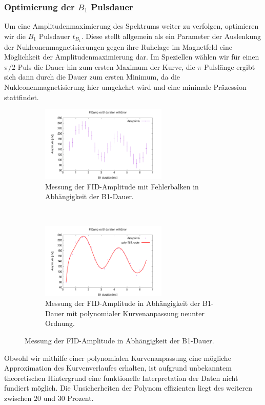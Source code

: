 \documentclass[../../main.tex]{subfiles}
\begin{document}
        \subsubsection*{Optimierung der $B_1$ Pulsdauer}\label{subsubsec:5:B1PulsdauerOptimierung}
            Um eine Amplitudenmaximierung des Spektrums weiter zu verfolgen, optimieren wir die $B_1$ Pulsdauer $t_{B_1}$. Diese stellt allgemein als ein Parameter der Auslenkung der Nukleonenmagnetisierungen gegen ihre Ruhelage im Magnetfeld eine Möglichkeit der Amplitudenmaximierung dar. Im Speziellen wählen wir für einen $\pi/2$ Puls die Dauer hin zum ersten Maximum der Kurve, die $\pi$ Pulslänge ergibt sich dann durch die Dauer zum ersten Minimum, da die Nukleonenmagnetisierung hier umgekehrt wird und eine minimale Präzession stattfindet. 
            \begin{figure}[H]
                \centering
                \begin{subfigure}[t]{0.45\textwidth}
                    \centering
                    \includegraphics[width=6cm]{Bilddateien/5/B1DurationFast_FIDamp_vs_B1duration_withError.png}
                    \caption{Messung der FID-Amplitude mit Fehlerbalken in Abhängigkeit der B1-Dauer.}
                    \label{fig:5:FastFIDampVsB1durationWithError}
                \end{subfigure}
                \
                \begin{subfigure}[t]{0.45\textwidth}
                    \centering
                    \includegraphics[width=6cm]{Bilddateien/5/B1DurationFast_FIDamp_vs_B1duration_withError_poly.png}
                    \caption{Messung der FID-Amplitude in Abhängigkeit der B1-Dauer mit polynomialer Kurvenanpassung neunter Ordnung.}
                    \label{fig:5:FastFIDampVsB1duration}
                \end{subfigure}
                \caption{Messung der FID-Amplitude in Abhängigkeit der B1-Dauer.}
            \end{figure}
            Obwohl wir mithilfe einer polynomialen Kurvenanpassung eine mögliche Approximation des Kurvenverlaufes erhalten, ist aufgrund unbekanntem theoretischen Hintergrund eine funktionelle Interpretation der Daten nicht fundiert möglich. Die Unsicherheiten der Polynom effizienten liegt des weiteren zwischen $20$ und $30$ Prozent. \\
\end{document}
